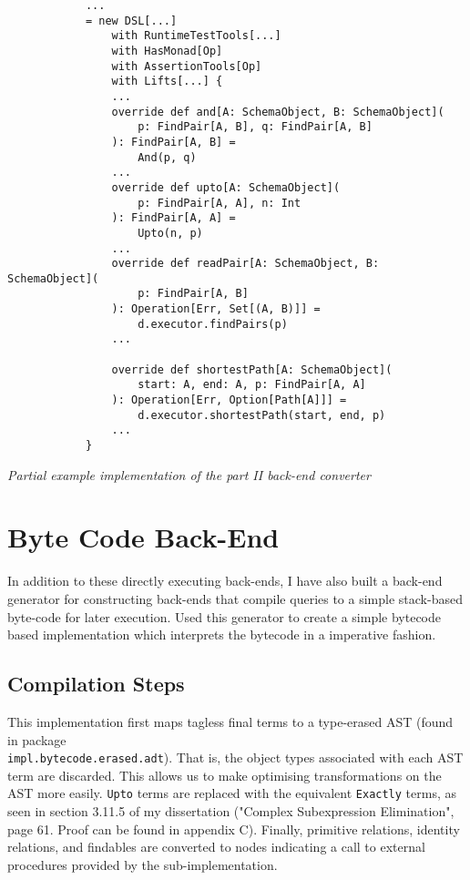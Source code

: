 \documentclass{report}
\newcommand \2[0]{\textbf{2}}
\newcommand \3[0]{\textbf{3}}
\begin{document}
\begin{framed}
    \begin{framed}
        \begin{verbatim}
            ...
            = new DSL[...]
                with RuntimeTestTools[...]
                with HasMonad[Op]
                with AssertionTools[Op]
                with Lifts[...] {
                ...
                override def and[A: SchemaObject, B: SchemaObject](
                    p: FindPair[A, B], q: FindPair[A, B]
                ): FindPair[A, B] =
                    And(p, q)
                ...
                override def upto[A: SchemaObject](
                    p: FindPair[A, A], n: Int
                ): FindPair[A, A] =
                    Upto(n, p)
                ...
                override def readPair[A: SchemaObject, B: SchemaObject](
                    p: FindPair[A, B]
                ): Operation[Err, Set[(A, B)]] =
                    d.executor.findPairs(p)
                ...
                    
                override def shortestPath[A: SchemaObject](
                    start: A, end: A, p: FindPair[A, A]
                ): Operation[Err, Option[Path[A]]] =
                    d.executor.shortestPath(start, end, p)
                ...
            }
            \end{verbatim}
    \end{framed}  

    \textit{Partial example implementation of the part II back-end converter}
\end{framed}
\section{Byte Code Back-End}

In addition to these directly executing back-ends, I have also built a back-end generator for constructing back-ends that compile queries to a simple stack-based byte-code for later execution. Used this generator to create a simple bytecode based implementation which interprets the bytecode in a imperative fashion.

\subsection{Compilation Steps}
This implementation first maps tagless final terms to a type-erased AST (found in package \\\texttt{impl.bytecode.erased.adt}). That is, the object types associated with each AST term are discarded. This allows us to make optimising transformations on the AST more easily. \texttt{Upto} terms are replaced with the equivalent \texttt{Exactly} terms, as seen in section 3.11.5 of my dissertation ("Complex Subexpression Elimination", page 61. Proof can be found in appendix C). Finally, primitive relations, identity relations, and findables are converted to nodes indicating a call to external procedures provided by the sub-implementation.
\end{document}
